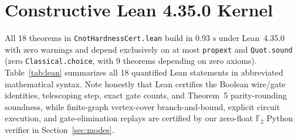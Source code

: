 \documentclass[10pt,twocolumn]{article}
\begin{document}
\section{Constructive Lean 4.35.0 Kernel}

All 18 theorems in \texttt{CnotHardnessCert.lean} build in $0.93\text{ s}$ under Lean~4.35.0 with zero warnings and depend exclusively on at most \texttt{propext} and \texttt{Quot.sound} (zero \texttt{Classical.choice}, with 9 theorems depending on zero axioms). Table~\ref{tab:lean} summarizes all 18 quantified Lean statements in abbreviated mathematical syntax. Note honestly that Lean certifies the Boolean wire/gate identities, telescoping step, exact gate counts, and Theorem~5 parity-rounding soundness, while finite-graph vertex-cover branch-and-bound, explicit circuit execution, and gate-elimination replays are certified by our zero-float $\mathbb{F}_2$ Python verifier in Section~\ref{sec:modes}.
\end{document}
